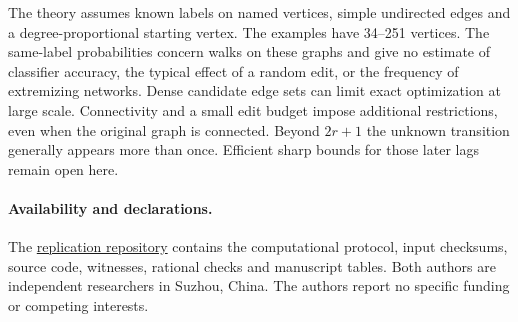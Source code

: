 \documentclass[11pt]{article}
\begin{document}
The theory assumes known labels on named vertices, simple undirected edges and a degree-proportional starting vertex. The examples have 34--251 vertices. The same-label probabilities concern walks on these graphs and give no estimate of classifier accuracy, the typical effect of a random edit, or the frequency of extremizing networks. Dense candidate edge sets can limit exact optimization at large scale. Connectivity and a small edit budget impose additional restrictions, even when the original graph is connected. Beyond $2r+1$ the unknown transition generally appears more than once. Efficient sharp bounds for those later lags remain open here.

\paragraph{Availability and declarations.}
The \href{https://github.com/fightforbelief/p6-graph-diffusion-bounds}{replication repository} contains the computational protocol, input checksums, source code, witnesses, rational checks and manuscript tables. Both authors are independent researchers in Suzhou, China. The authors report no specific funding or competing interests.
\end{document}
